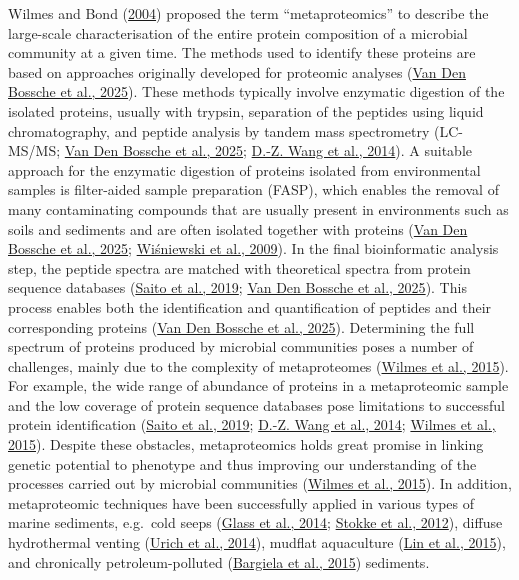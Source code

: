 \documentclass[
  12 pt,
]{book}
\begin{document}
Wilmes and Bond (\protect\hyperlink{ref-Wilmes2004}{2004}) proposed the term ``metaproteomics'' to describe the large-scale characterisation of the entire protein composition of a microbial community at a given time. The methods used to identify these proteins are based on approaches originally developed for proteomic analyses (\protect\hyperlink{ref-VanDenBossche2025}{Van Den Bossche et al., 2025}). These methods typically involve enzymatic digestion of the isolated proteins, usually with trypsin, separation of the peptides using liquid chromatography, and peptide analysis by tandem mass spectrometry (LC-MS/MS; \protect\hyperlink{ref-VanDenBossche2025}{Van Den Bossche et al., 2025}; \protect\hyperlink{ref-Wang2014}{D.-Z. Wang et al., 2014}). A suitable approach for the enzymatic digestion of proteins isolated from environmental samples is filter-aided sample preparation (FASP), which enables the removal of many contaminating compounds that are usually present in environments such as soils and sediments and are often isolated together with proteins (\protect\hyperlink{ref-VanDenBossche2025}{Van Den Bossche et al., 2025}; \protect\hyperlink{ref-Wisniewski2009}{Wiśniewski et al., 2009}). In the final bioinformatic analysis step, the peptide spectra are matched with theoretical spectra from protein sequence databases (\protect\hyperlink{ref-Saito2019}{Saito et al., 2019}; \protect\hyperlink{ref-VanDenBossche2025}{Van Den Bossche et al., 2025}). This process enables both the identification and quantification of peptides and their corresponding proteins (\protect\hyperlink{ref-VanDenBossche2025}{Van Den Bossche et al., 2025}). Determining the full spectrum of proteins produced by microbial communities poses a number of challenges, mainly due to the complexity of metaproteomes (\protect\hyperlink{ref-Wilmes2015}{Wilmes et al., 2015}). For example, the wide range of abundance of proteins in a metaproteomic sample and the low coverage of protein sequence databases pose limitations to successful protein identification (\protect\hyperlink{ref-Saito2019}{Saito et al., 2019}; \protect\hyperlink{ref-Wang2014}{D.-Z. Wang et al., 2014}; \protect\hyperlink{ref-Wilmes2015}{Wilmes et al., 2015}). Despite these obstacles, metaproteomics holds great promise in linking genetic potential to phenotype and thus improving our understanding of the processes carried out by microbial communities (\protect\hyperlink{ref-Wilmes2015}{Wilmes et al., 2015}). In addition, metaproteomic techniques have been successfully applied in various types of marine sediments, e.g.~cold seeps (\protect\hyperlink{ref-Glass2014}{Glass et al., 2014}; \protect\hyperlink{ref-Stokke2012}{Stokke et al., 2012}), diffuse hydrothermal venting (\protect\hyperlink{ref-Urich2014}{Urich et al., 2014}), mudflat aquaculture (\protect\hyperlink{ref-Lin2015}{Lin et al., 2015}), and chronically petroleum-polluted (\protect\hyperlink{ref-Bargiela2015}{Bargiela et al., 2015}) sediments.
\end{document}
